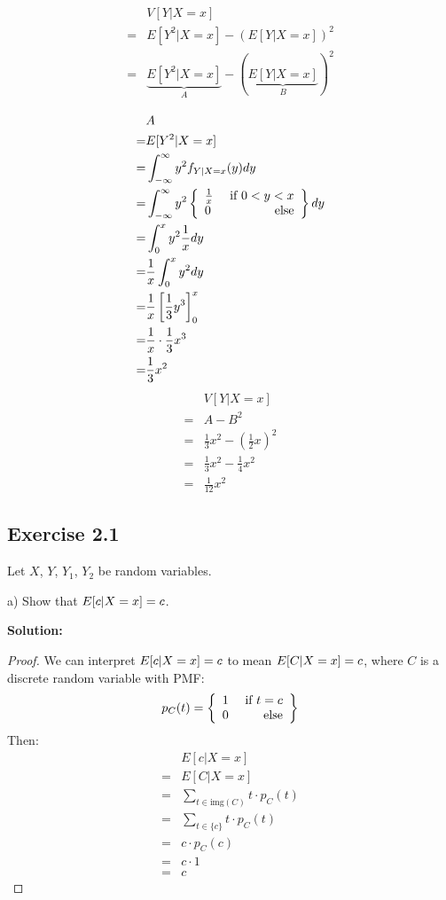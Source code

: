 \documentclass{article}
\begin{document}
\begin{align*}
     & V[Y|X=x] \\
    =& E[Y^2|X=x] - (E[Y|X=x])^2 \\
    =& \underbrace{E[Y^2|X=x]}_A - (\underbrace{E[Y|X=x]}_{B})^2 \\
\end{align*}
\begin{align*}
     & A \\
    =& E[Y^2|X=x] \\
    =& \int_{-\infty}^{\infty} y^2 f_{Y|X=x}(y)dy \\
    =& \int_{-\infty}^{\infty} y^2 \left\{\begin{array}{lr}\frac{1}{x} & \text{ if }0<y<x\\0 & \text{ else}\end{array}\right\}dy \\
    =& \int_0^x y^2 \frac{1}{x}dy \\
    =& \frac{1}{x}\int_0^x y^2 dy \\
    =& \frac{1}{x}\left[\frac13y^3\right]_0^x \\
    =& \frac{1}{x}\cdot \frac13x^3 \\
    =& \frac13x^2
\end{align*}
\begin{align*}
     & V[Y|X=x] \\
    =& A-B^2 \\
    =& \frac{1}{3}x^2-\left(\frac{1}{2}x\right)^2 \\
    =& \frac{1}{3}x^2-\frac{1}{4}x^2 \\
    =& \frac{1}{12}x^2
\end{align*}

\subsection{Exercise 2.1}

Let \(X\), \(Y\), \(Y_1\), \(Y_2\) be random variables.

a)
Show that \(E\lbrack c|X=x\rbrack=c\).

\textbf{Solution:}

\begin{proof}
We can interpret \(E\lbrack c|X=x\rbrack=c\) to mean \(E\lbrack C|X=x\rbrack=c\),
where \(C\) is a discrete random variable with PMF:
\[p_C(t) = \left\{\begin{array}{lr}1 & \text{ if }t=c\\0 & \text{ else}\end{array}\right\}\]
Then:
\begin{align*}
     & E[c|X=x] \\
    =& E[C|X=x] \\
    =& \sum_{t\in \text{img}(C)}t\cdot p_C(t) \\
    =& \sum_{t\in \{c\}}t\cdot p_C(t) \\
    =& c\cdot p_C(c) \\
    =& c\cdot 1 \\
    =& c
\end{align*}
\end{proof}
\end{document}
